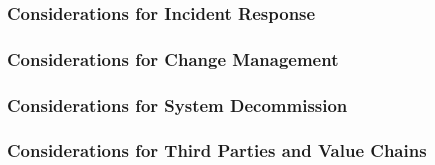 \documentclass[fleqn]{article}
\begin{document}
\subsubsection{Considerations for Incident Response}\label{sec:response}


\subsubsection{Considerations for Change Management}\label{sec:change}


\subsubsection{Considerations for System Decommission}\label{sec:decom}


\subsubsection{Considerations for Third Parties and Value Chains}\label{sec:3p}



\end{document}
